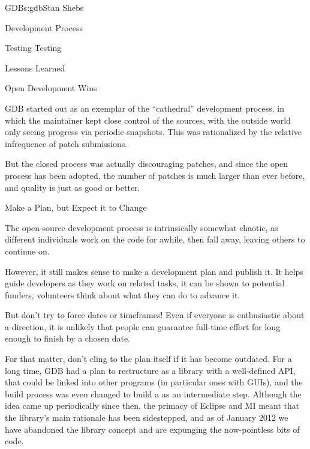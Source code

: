 \begin{aosachapter}{GDB}{s:gdb}{Stan Shebs}
\begin{aosasect1}{Development Process}
\begin{aosasect2}{Testing Testing}
\end{aosasect2}

\end{aosasect1}

\begin{aosasect1}{Lessons Learned}

\begin{aosasect2}{Open Development Wins}

GDB started out as an exemplar of the ``cathedral'' development
process, in which the maintainer kept close control of the sources,
with the outside world only seeing progress via periodic snapshots.
This was rationalized by the relative infrequence of patch submissions.

But the closed process was actually discouraging patches, and since
the open process has been adopted, the number of patches is much
larger than ever before, and quality is just as good or better.

\end{aosasect2}

\begin{aosasect2}{Make a Plan, but Expect it to Change}

The open-source development process is intrinsically somewhat chaotic,
as different individuals work on the code for awhile, then fall away,
leaving others to continue on.

However, it still makes sense to make a development plan and publish
it.  It helps guide developers as they work on related tasks, it can
be shown to potential funders, volunteers think about what they can do
to advance it.

But don't try to force dates or timeframes!  Even if everyone is
enthusiastic about a direction, it is unlikely that people can
guarantee full-time effort for long enough to finish by a chosen date.

For that matter, don't cling to the plan itself if it has become
outdated.  For a long time, GDB had a plan to restructure as a library
 with a well-defined API, that could be linked into other
programs (in particular ones with GUIs), and the build process was
even changed to build a  as an intermediate step.
Although the idea came up periodically since then, the primacy of
Eclipse and MI meant that the library's main rationale has been
sidestepped, and as of January 2012 we have abandoned the library
concept and are expunging the now-pointless bits of code.

\end{aosasect2}


\end{aosasect1}
\end{aosachapter}
